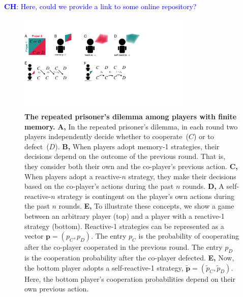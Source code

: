 \documentclass[11pt]{article}
\newcommand{\christian}[1]{\textcolor{blue}{\textbf{CH}: #1}}
\begin{document}
\christian{Here, could we provide a link to some online repository?} 

{\setlength{\bibsep}{0\baselineskip}


}


\clearpage
\newpage

\begin{figure}[t]
  \centering
  \includegraphics[width=0.75\textwidth]{figures/conceptual_figure_model.pdf}
  \caption{\textbf{The repeated prisoner's dilemma among players with finite memory.}
  \textbf{A,} In the repeated prisoner's dilemma, in each round two players independently decide whether to cooperate~($C$) or to defect~($D$). 
   \textbf{B,} When players adopt memory-1 strategies, their decisions depend on the outcome of the previous round. That is, they consider both their own and the co-player's previous action. 
   \textbf{C,} When players adopt a reactive-$n$ strategy, they make their decisions based on the co-player's actions during the past $n$ rounds. 
   \textbf{D,} A self-reactive-$n$ strategy is contingent on the player's own actions during the past $n$ rounds. 
   \textbf{E,} To illustrate these concepts, we show a game between an arbitrary player (top) and a player with a reactive-1 strategy (bottom). 
   Reactive-1 strategies can be represented as a vector  $\mathbf{p} \!=\! (p_C, p_D)$. 
   The entry $p_C$ is the probability of cooperating after the co-player cooperated in the previous round.
   The entry $p_D$ is the cooperation probability after the co-player defected. 
   \textbf{E,} Now, the bottom player adopts a self-reactive-1 strategy, $\mathbf{\tilde p}\!=\!(\tilde p_C, \tilde p_D)$. 
   Here, the bottom player's cooperation probabilities depend on their own previous action. }\label{fig:conceptual_figure_model}
\end{figure}
\end{document}
